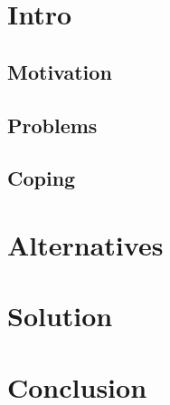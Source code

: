 \begin{frame}
 \titlepage
\end{frame}

\section{Intro}

\subsection{Motivation}

\subsection{Problems}

\subsection{Coping}

\section{Alternatives}


\section{Solution}


\section{Conclusion}

